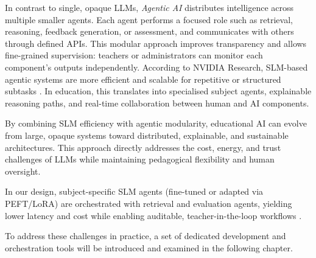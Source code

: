 In contrast to single, opaque LLMs, \textit{Agentic AI} distributes intelligence across multiple smaller agents. Each agent performs a focused role such as retrieval, reasoning, feedback generation, or assessment, and communicates with others through defined APIs. This modular approach improves transparency and allows fine-grained supervision: teachers or administrators can monitor each component’s outputs independently. According to NVIDIA Research, SLM-based agentic systems are more efficient and scalable for repetitive or structured subtasks \parencite{SmallLan73:online}. In education, this translates into specialised subject agents, explainable reasoning paths, and real-time collaboration between human and AI components.

By combining SLM efficiency with agentic modularity, educational AI can evolve from large, opaque systems toward distributed, explainable, and sustainable architectures. This approach directly addresses the cost, energy, and trust challenges of LLMs while maintaining pedagogical flexibility and human oversight.

In our design, subject-specific SLM agents (fine-tuned or adapted via PEFT/LoRA) are orchestrated with retrieval and evaluation agents, yielding lower latency and cost while enabling auditable, teacher-in-the-loop workflows \parencite{SmallLan73:online,2106096835:online}.

To address these challenges in practice, a set of dedicated development and orchestration tools will be introduced and examined in the following chapter.